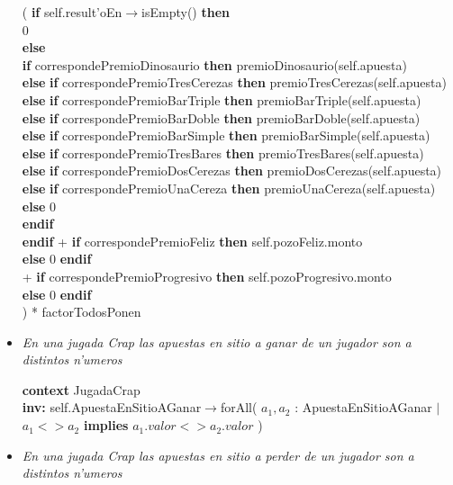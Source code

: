 \begin{itemize}
(
    \textbf{if} self.result'oEn$\rightarrow$isEmpty() \textbf{then}\\
        0\\
    \textbf{else}\\
        \textbf{if} correspondePremioDinosaurio \textbf{then} premioDinosaurio(self.apuesta)\\
        \textbf{else} \textbf{if} correspondePremioTresCerezas \textbf{then} premioTresCerezas(self.apuesta)\\
        \textbf{else} \textbf{if} correspondePremioBarTriple \textbf{then} premioBarTriple(self.apuesta)\\
        \textbf{else} \textbf{if} correspondePremioBarDoble \textbf{then} premioBarDoble(self.apuesta)\\
        \textbf{else} \textbf{if} correspondePremioBarSimple \textbf{then} premioBarSimple(self.apuesta)\\
        \textbf{else} \textbf{if} correspondePremioTresBares \textbf{then} premioTresBares(self.apuesta)\\
        \textbf{else} \textbf{if} correspondePremioDosCerezas \textbf{then} premioDosCerezas(self.apuesta)\\
        \textbf{else} \textbf{if} correspondePremioUnaCereza \textbf{then} premioUnaCereza(self.apuesta)\\
        \textbf{else} 0\\
        \textbf{endif}\\
    \textbf{endif}
    + \textbf{if} correspondePremioFeliz \textbf{then} self.pozoFeliz.monto\\ \textbf{else} 0 \textbf{endif}\\
    + \textbf{if} correspondePremioProgresivo \textbf{then} self.pozoProgresivo.monto\\ \textbf{else} 0 \textbf{endif}\\
) * factorTodosPonen

\clearpage


\item\textit{ En una jugada Crap las apuestas en sitio a ganar de un jugador son a distintos n'umeros}

\textbf{context}  JugadaCrap \\ \textbf{inv:} 
  self.ApuestaEnSitioAGanar$\rightarrow$forAll( $a_{1}, a_{2}$ : ApuestaEnSitioAGanar $ | $ $ a_{1} <> a_{2} $  \textbf{implies} $ a_{1}.valor <> a_{2}.valor $ )


\item\textit{ En una jugada Crap las apuestas en sitio a perder de un jugador son a distintos n'umeros}


\end{itemize}
